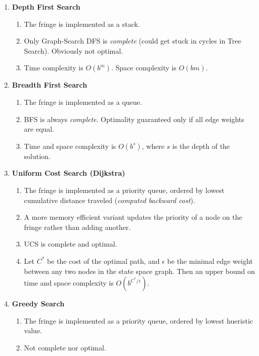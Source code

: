 \documentclass[10pt]{article}
\begin{document}
\begin{multicols}{2}
\begin{enumerate}
\begin{enumerate}
         \item \textbf{Depth First Search}
         \begin{enumerate}
             \item The fringe is implemented as a stack. 
             \item Only Graph-Search DFS is \textit{complete} (could get stuck in cycles in Tree Search). Obviously not optimal.
             \item Time complexity is $O(b^m)$. Space complexity is $O(bm)$.
         \end{enumerate}
         
         \item \textbf{Breadth First Search}
         \begin{enumerate}
             \item The fringe is implemented as a queue. 
             \item BFS is always \textit{complete}. Optimality guaranteed only if all edge weights are equal. 
             \item Time and space complexity is $O(b^s)$, where $s$ is the depth of the solution.
         \end{enumerate}
         
         \item \textbf{Uniform Cost Search (Dijkstra)}
         \begin{enumerate}
             \item The fringe is implemented as a priority queue, ordered by lowest cumulative distance traveled (\textit{computed backward cost}). 
             \item A more memory efficient variant updates the priority of a node on the fringe rather than adding another.
             \item UCS is complete and optimal.
             \item Let $C^*$ be the cost of the optimal path, and $\epsilon$ be the minimal edge weight between any two nodes in the state space graph. Then an upper bound on time and space complexity is $O(b^{C^* / \epsilon})$.
         \end{enumerate}
         
         \item \textbf{Greedy Search}
         \begin{enumerate}
             \item The fringe is implemented as a priority queue, ordered by lowest hueristic value.
             \item Not complete nor optimal.
         \end{enumerate}
         

\end{enumerate}
\end{enumerate}
\end{multicols}
\end{document}
